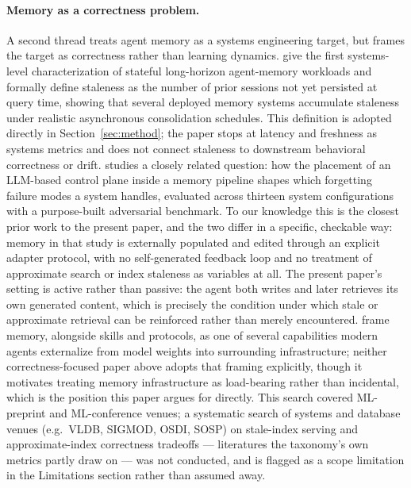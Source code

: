 \documentclass{article}
\begin{document}
\paragraph{Memory as a correctness problem.} A second thread treats agent memory as a systems engineering target, but frames the target as correctness rather than learning dynamics. \citet{omri2026agentmemory} give the first systems-level characterization of stateful long-horizon agent-memory workloads and formally define staleness as the number of prior sessions not yet persisted at query time, showing that several deployed memory systems accumulate staleness under realistic asynchronous consolidation schedules. This definition is adopted directly in Section~\ref{sec:method}; the paper stops at latency and freshness as systems metrics and does not connect staleness to downstream behavioral correctness or drift. \citet{yang2026controlplane} studies a closely related question: how the placement of an LLM-based control plane inside a memory pipeline shapes which forgetting failure modes a system handles, evaluated across thirteen system configurations with a purpose-built adversarial benchmark. To our knowledge this is the closest prior work to the present paper, and the two differ in a specific, checkable way: memory in that study is externally populated and edited through an explicit adapter protocol, with no self-generated feedback loop and no treatment of approximate search or index staleness as variables at all. The present paper's setting is active rather than passive: the agent both writes and later retrieves its own generated content, which is precisely the condition under which stale or approximate retrieval can be reinforced rather than merely encountered. \citet{zhou2026externalization} frame memory, alongside skills and protocols, as one of several capabilities modern agents externalize from model weights into surrounding infrastructure; neither correctness-focused paper above adopts that framing explicitly, though it motivates treating memory infrastructure as load-bearing rather than incidental, which is the position this paper argues for directly. This search covered ML-preprint and ML-conference venues; a systematic search of systems and database venues (e.g.\ VLDB, SIGMOD, OSDI, SOSP) on stale-index serving and approximate-index correctness tradeoffs --- literatures the taxonomy's own metrics partly draw on --- was not conducted, and is flagged as a scope limitation in the Limitations section rather than assumed away.
\end{document}
